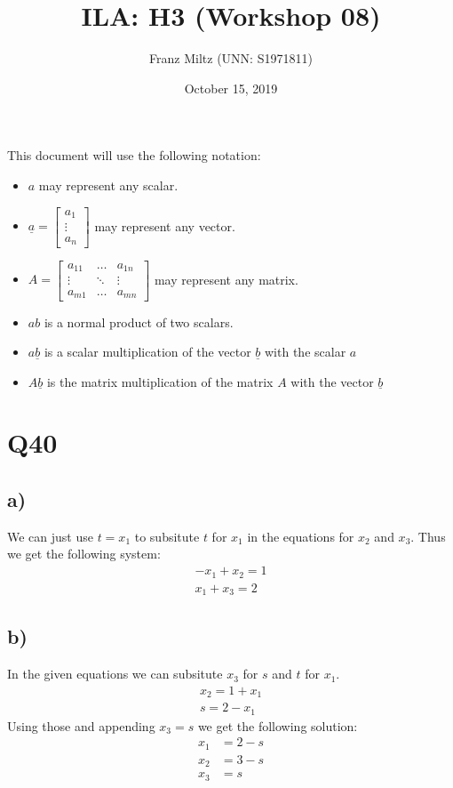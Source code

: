 \documentclass{article}
\title{ILA: H3 (Workshop 08)}
\author{Franz Miltz (UNN: S1971811)}
\date{October 15, 2019}
\renewcommand{\vec}{\underline}
\begin{document}
\maketitle
This document will use the following notation:
\begin{itemize}
    \item $a$ may represent any scalar.
    \item $\vec{a}=\begin{bmatrix}
        a_1\\
        \vdots\\
        a_n
    \end{bmatrix}$ may represent any vector.
    \item $A=\begin{bmatrix}
        a_{11} &\dots &a_{1n}\\
        \vdots &\ddots &\vdots\\
        a_{m1} &\dots &a_{mn}
    \end{bmatrix}$ may represent any matrix.
    \item $ab$ is a normal product of two scalars.
    \item $a\vec{b}$ is a scalar multiplication of the vector $\vec{b}$ with the scalar $a$
    \item $A\vec b$ is the matrix multiplication of the matrix $A$ with the vector $\vec b$
\end{itemize}
\section*{Q40}
\subsection*{a)}
We can just use $t=x_1$ to subsitute $t$ for $x_1$ in the equations for $x_2$ and $x_3$. Thus we get the following system:
\begin{align*}
    -x_1+x_2=1\\
    x_1+x_3=2 
\end{align*}
\subsection*{b)}
In the given equations we can subsitute $x_3$ for $s$ and $t$ for $x_1$.
\begin{align*}
    x_2 = 1 + x_1\\
    s = 2 - x_1
\end{align*}
Using those and appending $x_3=s$ we get the following solution:
\begin{align*}
    x_1 &= 2-s\\ 
    x_2 &= 3-s\\ 
    x_3 &= s
\end{align*}
\end{document}
